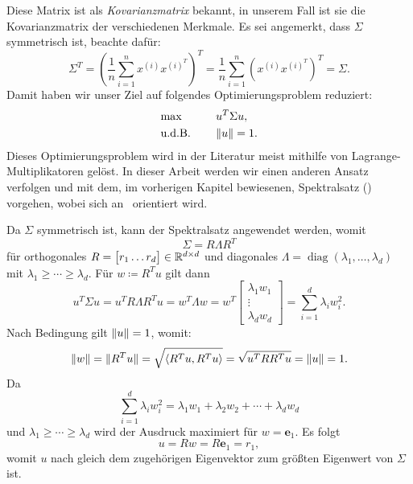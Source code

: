 Diese Matrix ist als \emph{Kovarianzmatrix} bekannt, in unserem Fall ist sie die Kovarianzmatrix der verschiedenen Merkmale.
Es sei angemerkt, dass \(\Sigma\) symmetrisch ist, beachte dafür:
\begin{equation*}
    \Sigma^{T} = {\left(\frac{1}{n}\sum_{i=1}^{n}x^{(i)}x^{{(i)}^{T}}\right)}^{T} = \frac{1}{n}\sum_{i=1}^{n}{\left(x^{(i)}x^{{(i)}^{T}}\right)}^{T} = \Sigma.
\end{equation*}
Damit haben wir unser Ziel auf folgendes Optimierungsproblem reduziert:
\begin{alignat*}{2}
    &\!\max \qquad &&u^{T} \Sigma u, \\
    &\text{u.d.B.}  &&\lVert u\rVert=1.
\end{alignat*}
Dieses Optimierungsproblem wird in der Literatur meist mithilfe von Lagrange-Multiplikatoren gelöst.
In dieser Arbeit werden wir einen anderen Ansatz verfolgen und mit dem, im vorherigen Kapitel bewiesenen, Spektralsatz () vorgehen, wobei sich an~\cite{hsuMachineLearningTheory2016} orientiert wird.

Da \(\Sigma\) symmetrisch ist, kann der Spektralsatz angewendet werden, womit 
\begin{equation*}
    \Sigma = R \Lambda R^{T}
\end{equation*}
für orthogonales \(R =
\big[
    \begin{matrix}
        r_{1}\ldots r_{d}
    \end{matrix}
\big] \in \mathbb{R}^{d \times d}\) und diagonales \(\Lambda = \operatorname{diag}(\lambda_1,\ldots,\lambda_d)\) mit \(\lambda_1 \geq \cdots \geq \lambda_d\).
Für \(w \coloneqq R^{T}u\) gilt dann
\begin{equation*}
    u^{T}\Sigma u = u^{T}R \Lambda R^{T} u = w^{T}\Lambda w = w^{T}
    \begin{bmatrix}
        \lambda_1 w_{1} \\
        \vdots \\
        \lambda_d w_{d}
    \end{bmatrix}
    =\sum_{i=1}^{d}\lambda_{i}w_{i}^{2}.
\end{equation*}
Nach Bedingung gilt \(\lVert u\rVert=1\), womit:
\begin{equation*}
    \lVert w\rVert = \lVert R^{T}u\rVert = \sqrt{\langle R^{T}u,R^{T}u \rangle} = \sqrt{u^{T}RR^{T}u} = \lVert u\rVert = 1.
\end{equation*} 
Da 
\begin{equation*}
    \sum_{i=1}^{d}\lambda_{i}w_{i}^{2} = \lambda_{1}w_{1} + \lambda_{2}w_{2} + \cdots + \lambda_{d}w_{d}
\end{equation*}
und \(\lambda_1 \geq \cdots \geq \lambda_d\) wird der Ausdruck maximiert für \(w = \symbf{e}_{1}\).
Es folgt
\begin{equation*}
    u = Rw = R\symbf{e}_{1} = r_{1},
\end{equation*}
womit \(u\) nach  gleich dem zugehörigen Eigenvektor zum größten Eigenwert von \(\Sigma\) ist.  